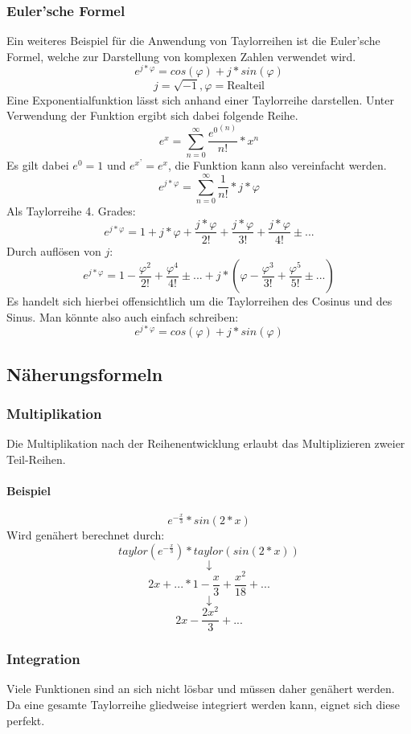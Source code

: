 \documentclass{school}
\begin{document}
\subsubsection{Euler'sche Formel}
Ein weiteres Beispiel f\"ur die Anwendung von Taylorreihen ist die Euler'sche Formel, welche zur Darstellung von komplexen Zahlen verwendet wird.
$$e^{j*\varphi}=cos(\varphi)+j*sin(\varphi)$$
$$j = \sqrt{-1}, \varphi = \text{Realteil}$$
Eine Exponentialfunktion l\"asst sich anhand einer Taylorreihe darstellen. Unter Verwendung der Funktion ergibt sich dabei folgende Reihe.
$$e^x=\sum_{n=0}^\infty \frac{{e^{0}}^{(n)}}{n!}*x^n$$
Es gilt dabei $e^0 = 1$ und ${e^x}^\text{'} = e^x$, die Funktion kann also vereinfacht werden.
$$e^{j*\varphi}=\sum_{n=0}^\infty \frac{1}{n!}*j*\varphi$$
Als Taylorreihe 4. Grades:
$$e^{j*\varphi}=1 + j*\varphi + \frac{j*\varphi}{2!} + \frac{j*\varphi}{3!} + \frac{j*\varphi}{4!} \pm ...$$
Durch aufl\"osen von $j$:
$$e^{j*\varphi}=1 - \frac{\varphi^2}{2!} + \frac{\varphi^4}{4!} \pm ... + j * (\varphi - \frac{\varphi^3}{3!} + \frac{\varphi^5}{5!} \pm ...)$$
Es handelt sich hierbei offensichtlich um die Taylorreihen des Cosinus und des Sinus. Man könnte also auch einfach schreiben:
$$e^{j*\varphi}=cos(\varphi)+j*sin(\varphi)$$

\newpage

\subsection{N\"aherungsformeln}
\subsubsection{Multiplikation}
Die Multiplikation nach der Reihenentwicklung erlaubt das Multiplizieren zweier Teil-Reihen.

\paragraph{Beispiel}
$$e^{-\frac{x}{3}}*sin(2*x)$$
Wird gen\"ahert berechnet durch:
$$taylor(e^{-\frac{x}{3}})*taylor(sin(2*x))$$
$$\downarrow$$
\[2 x+\mbox{...} * 1-\frac{x}{3}+\frac{{{x}^{2}}}{18}+\mbox{...}\]
$$\downarrow$$
\[2 x-\frac{2 {{x}^{2}}}{3}+\mbox{...}\]

\subsubsection{Integration}
Viele Funktionen sind an sich nicht l\"osbar und m\"ussen daher gen\"ahert werden.
Da eine gesamte Taylorreihe gliedweise integriert werden kann, eignet sich diese perfekt.
\end{document}
